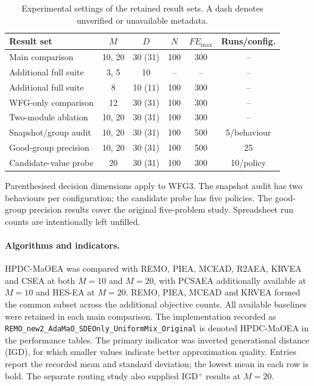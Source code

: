 \begin{table}[t]
\centering
\caption{Experimental settings of the retained result sets. A dash denotes unverified or unavailable metadata.}
\label{tab:exp:settings}
\footnotesize
\setlength{\tabcolsep}{3pt}
\renewcommand{\arraystretch}{1.12}
\begin{tabular}{lccccc}
\toprule
Result set & $M$ & $D$ & $N$ & $FE_{\max}$ & Runs/config. \\
\midrule
Main comparison & 10, 20 & 30 (31) & 100 & 300 & -- \\
Additional full suite & 3, 5 & 10 & -- & -- & -- \\
Additional full suite & 8 & 10 (11) & 100 & 300 & -- \\
WFG-only comparison & 12 & 30 (31) & 100 & 300 & -- \\
Two-module ablation & 10, 20 & 30 (31) & 100 & 300 & -- \\
Snapshot/group audit & 10, 20 & 30 (31) & 100 & 500 & 5/behaviour \\
Good-group precision & 10, 20 & 30 (31) & 100 & 500 & 25 \\
Candidate-value probe & 20 & 30 (31) & 100 & 300 & 10/policy \\
\bottomrule
\end{tabular}
\par\smallskip
\begin{minipage}{\linewidth}
\scriptsize Parenthesised decision dimensions apply to WFG3. The snapshot audit has two behaviours per configuration; the candidate probe has five policies. The good-group precision results cover the original five-problem study. Spreadsheet run counts are intentionally left unfilled.
\end{minipage}
\end{table}

\paragraph{Algorithms and indicators.}
HPDC-MaOEA was compared with REMO, PIEA, MCEAD, R2AEA, KRVEA and CSEA at both
$M=10$ and $M=20$, with PCSAEA additionally available at $M=10$ and HES-EA at
$M=20$. REMO, PIEA, MCEAD and KRVEA formed the common subset across the
additional objective counts. All available baselines were retained in each
main comparison. The implementation recorded as
\texttt{REMO\_new2\_AdaMaO\_SDEOnly\_UniformMix\_Original} is denoted
HPDC-MaOEA in the performance tables.
The primary indicator was inverted generational distance (IGD), for which
smaller values indicate better approximation quality. Entries report the
recorded mean and standard deviation; the lowest mean in each row is bold.
The separate routing study also supplied IGD$^+$ results at $M=20$.


